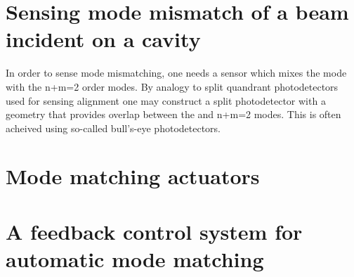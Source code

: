 
\section{Sensing mode mismatch of a beam incident on a cavity}
In order to sense mode mismatching, one needs a sensor which mixes the  mode with the n+m=2 order modes. %
By analogy to split quandrant photodetectors used for sensing alignment one may construct a split photodetector with a geometry that provides overlap between the  and n+m=2 modes. %
This is often acheived using so-called bull's-eye photodetectors.


\section{Mode matching actuators}

\section{A feedback control system for automatic mode matching}

